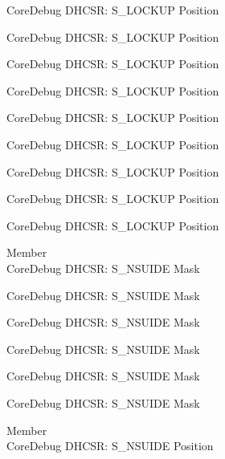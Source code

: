 \begin{DoxyRefList}
\label{deprecated__deprecated000574}%
%
Core\+Debug DHCSR\+: S\+\_\+\+LOCKUP Position 

\label{deprecated__deprecated000680}%
%
Core\+Debug DHCSR\+: S\+\_\+\+LOCKUP Position 

\label{deprecated__deprecated000772}%
%
Core\+Debug DHCSR\+: S\+\_\+\+LOCKUP Position 

\label{deprecated__deprecated000826}%
%
Core\+Debug DHCSR\+: S\+\_\+\+LOCKUP Position 

\label{deprecated__deprecated000911}%
%
Core\+Debug DHCSR\+: S\+\_\+\+LOCKUP Position 

\label{deprecated__deprecated000968}%
%
Core\+Debug DHCSR\+: S\+\_\+\+LOCKUP Position 

\label{deprecated__deprecated001044}%
%
Core\+Debug DHCSR\+: S\+\_\+\+LOCKUP Position 

\label{deprecated__deprecated001131}%
%
Core\+Debug DHCSR\+: S\+\_\+\+LOCKUP Position 

\label{deprecated__deprecated001233}%
%
Core\+Debug DHCSR\+: S\+\_\+\+LOCKUP Position  
\item[Member \doxylink{group___c_m_s_i_s___s_c_b_gabe0164afd9f6b8800fb7e05280e0ecda}{Core\+Debug\+\_\+\+DHCSR\+\_\+\+S\+\_\+\+NSUIDE\+\_\+\+Msk} ]\hfill \\
\label{deprecated__deprecated000018}%
%
Core\+Debug DHCSR\+: S\+\_\+\+NSUIDE Mask 

\label{deprecated__deprecated000469}%
%
Core\+Debug DHCSR\+: S\+\_\+\+NSUIDE Mask 

\label{deprecated__deprecated000571}%
%
Core\+Debug DHCSR\+: S\+\_\+\+NSUIDE Mask 

\label{deprecated__deprecated000677}%
%
Core\+Debug DHCSR\+: S\+\_\+\+NSUIDE Mask 

\label{deprecated__deprecated001128}%
%
Core\+Debug DHCSR\+: S\+\_\+\+NSUIDE Mask 

\label{deprecated__deprecated001230}%
%
Core\+Debug DHCSR\+: S\+\_\+\+NSUIDE Mask  
\item[Member \doxylink{group___c_m_s_i_s___s_c_b_ga59e228c682eec72e892b2ce018afe477}{Core\+Debug\+\_\+\+DHCSR\+\_\+\+S\+\_\+\+NSUIDE\+\_\+\+Pos} ]\hfill \\
\label{deprecated__deprecated000017}%
%
Core\+Debug DHCSR\+: S\+\_\+\+NSUIDE Position 


\end{DoxyRefList}
